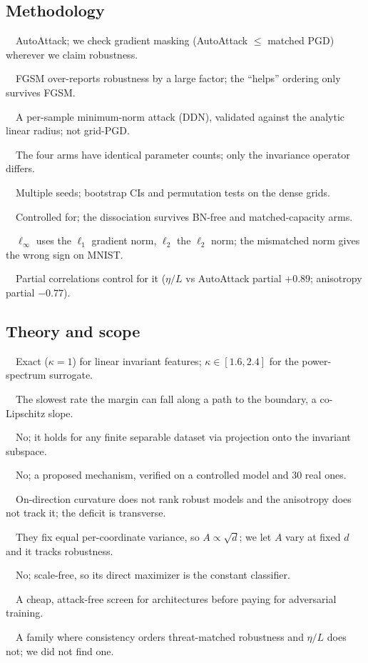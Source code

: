 \documentclass[11pt]{article}
\newcommand{\etaL}{\ensuremath{\eta/L}}
\newcommand{\qa}[2]{\par\vspace{0.5em}{\bfseries #1}\ \ #2\par}
\begin{document}
\subsection*{Methodology}
\qa{7. Which attack is the arbiter?}{AutoAttack; we check gradient masking (AutoAttack $\le$ matched PGD)
wherever we claim robustness.}
\qa{8. Why does FGSM vs AutoAttack matter?}{FGSM over-reports robustness by a large factor; the ``helps''
ordering only survives FGSM.}
\qa{9. How is the radius measured?}{A per-sample minimum-norm attack (DDN), validated against the analytic
linear radius; not grid-PGD.}
\qa{10. Capacity-matched, really?}{The four arms have identical parameter counts; only the invariance
operator differs.}
\qa{11. Seeds and confidence intervals?}{Multiple seeds; bootstrap CIs and permutation tests on the dense
grids.}
\qa{12. Is BatchNorm a confound (Galloway)?}{Controlled for; the dissociation survives BN-free and
matched-capacity arms.}
\qa{13. Threat-matching, concretely?}{$\ell_\infty$ uses the $\ell_1$ gradient norm, $\ell_2$ the $\ell_2$
norm; the mismatched norm gives the wrong sign on MNIST.}
\qa{14. Clean-accuracy confound?}{Partial correlations control for it (\etaL{} vs AutoAttack partial
$+0.89$; anisotropy partial $-0.77$).}

\subsection*{Theory and scope}
\qa{15. Is the bracket tight?}{Exact ($\kappa=1$) for linear invariant features; $\kappa\in[1.6,2.4]$ for
the power-spectrum surrogate.}
\qa{16. What is $\alpha$?}{The slowest rate the margin can fall along a path to the boundary, a
co-Lipschitz slope.}
\qa{17. Does Proposition 1 need orbit-closure?}{No; it holds for any finite separable dataset via
projection onto the invariant subspace.}
\qa{18. Is the deficit a theorem?}{No; a proposed mechanism, verified on a controlled model and 30 real
ones.}
\qa{19. Why is curvature not the ranker?}{On-direction curvature does not rank robust models and the
anisotropy does not track it; the deficit is transverse.}
\qa{20. Relation to Simon-Gabriel?}{They fix equal per-coordinate variance, so $A\propto\sqrt d$; we let
$A$ vary at fixed $d$ and it tracks robustness.}
\qa{21. Can \etaL{} be trained?}{No; scale-free, so its direct maximizer is the constant classifier.}
\qa{22. What is the practical use?}{A cheap, attack-free screen for architectures before paying for
adversarial training.}
\qa{23. What would falsify the claim?}{A family where consistency orders threat-matched robustness and
\etaL{} does not; we did not find one.}
\end{document}
